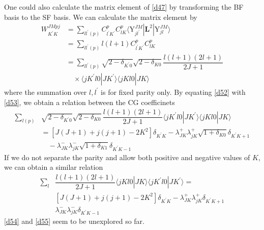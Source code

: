 \documentclass[]{article}
\begin{document}
One could also calculate the matrix element of \eqref{d47} by transforming the BF basis to the SF basis. We can calculate the matrix element by
\begin{align}
	W^{JMpj}_{K^\prime K}&=\sum\limits_{ll^\prime(p)}C^p_{l^\prime K^\prime}C^p_{lK}\langle \mathrm{Y}^{JM}_{jl^\prime}|\mathbf{L}^2|\mathrm{Y}^{JM}_{jl}\rangle\nonumber\\
	&=\sum\limits_{ll^\prime(p)}l(l+1)C^p_{l^\prime K^\prime}C^p_{lK}\nonumber\\
	&=\sum\limits_{ll^\prime(p)}\sqrt{2-\delta_{K^\prime0}}\sqrt{2-\delta_{K0}}\dfrac{l(l+1)(2l+1)}{2J+1}\nonumber\\
	&\quad\times\langle jK^\prime l0|JK^\prime\rangle\langle jKl0|JK\rangle
	\label{d53}
\end{align}
where the summation over $l,l^\prime$ is for fixed parity only. By equating \eqref{d52} with \eqref{d53}, we obtain a relation between the CG coefficinets
\begin{align}
	\sum\limits_{l(p)}&\sqrt{2-\delta_{K^\prime0}}\sqrt{2-\delta_{K0}}\dfrac{l(l+1)(2l+1)}{2J+1}\langle jK^\prime l0|JK^\prime\rangle\langle jKl0|JK\rangle\nonumber\\
	&=[J(J+1)+j(j+1)-2K^2]\delta_{K^\prime K}-\lambda^+_{JK}\lambda^+_{jK}\sqrt{1+\delta_{K0}}\delta_{K^\prime K+1}\nonumber\\
	&\quad-\lambda^-_{JK}\lambda^-_{jK}\sqrt{1+\delta_{K1}}\delta_{K^\prime K-1}
	\label{d54}
\end{align}
If we do not separate the parity and allow both positive and negative values of $K$, we can obtain a similar relation
\begin{align}
	\sum\limits_l&\dfrac{l(l+1)(2l+1)}{2J+1}\langle jKl0|JK\rangle\langle jK^\prime l0|JK^\prime\rangle=\nonumber\\
	&[J(J+1)+j(j+1)-2K^2]\delta_{K^\prime K}-\lambda^+_{JK}\lambda^+_{jK}\delta_{K^\prime K+1}\nonumber\\
	&\lambda^-_{JK}\lambda^-_{jK}\delta_{K^\prime K-1}
	\label{d55}
\end{align}
\eqref{d54} and \eqref{d55} seem to be unexplored so far.
\end{document}

